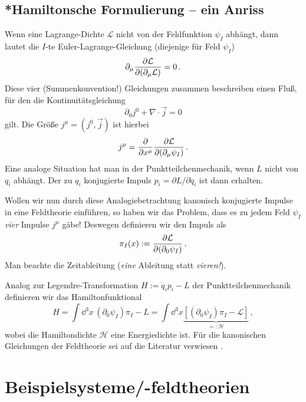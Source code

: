 \documentclass[paper=a4, fontsize=11.0pt, abstractoff, DIV12]{scrartcl}
\newcommand{\LD}{\ensuremath{\mathcal{L}}}
\newcommand{\HD}{\ensuremath{\mathcal{H}}}
\begin{document}
\subsection{*Hamiltonsche Formulierung -- ein Anriss}

Wenn eine Lagrange-Dichte $\LD$ nicht von der Feldfunktion $\psi_I$ abhängt,
dann lautet die $I$-te Euler-Lagrange-Gleichung (diejenige für Feld $\psi_I$)
\begin{equation}
\partial_\mu \firstpderiv{\LD}{(\partial_\mu\LD)} = 0\,.
\end{equation}
Diese vier (Summenkonvention!) Gleichungen zusammen beschreiben einen Fluß,
für den die Kontinuitätsgleichung
\begin{equation}
\partial_0 j^0 + \nabla \cdot\vec j = 0
\end{equation}
gilt. Die Größe $j^\mu=(j^0, \vec j)$ ist hierbei
\begin{equation}
j^\mu = \firstpderiv{}{x^\mu} \firstpderiv{\LD}{(\partial_\mu\psi_I)}\,.
\end{equation}
Eine analoge Situation hat man in der Punktteilchenmechanik, wenn $L$ nicht
von $q_i$ abhängt. Der zu $q_i$ konjugierte Impuls $p_i = \partial
L/\partial\dot q_i$ ist dann erhalten.

Wollen wir nun durch diese Analogiebetrachtung kanonisch konjugierte Impulse
in eine Feldtheorie einführen, so haben wir das Problem, dass es zu jedem
Feld $\psi_I$ \emph{vier} Impulse $j^\mu$ gäbe! Deswegen definieren wir den
Impuls als
\begin{equation}
\pi_I(x) := \firstpderiv{\LD}{(\partial_0 \psi_I)}\,.
\end{equation}
Man beachte die Zeitableitung (\emph{eine} Ableitung statt \emph{vieren!}).

Analog zur Legendre-Transformation $H := \dot q_i p_i - L$ der
Punktteilchenmechanik definieren wir das Hamiltonfunktional
\begin{equation}
H = \int\!\dd^3 x\,(\partial_0\psi_I)\pi_I - L = \int\!\dd^3x\underbrace{\left[(\partial_0\psi_I)\pi_I - \LD\right]}_{=:\HD}\,,
\end{equation}
wobei die Hamiltondichte $\HD$ eine Energiedichte ist. Für die kanonischen
Gleichungen der Feldtheorie sei auf die Literatur verwiesen \cite
{JoseSaletan}.

\section{Beispielsysteme/-feldtheorien}
\end{document}
